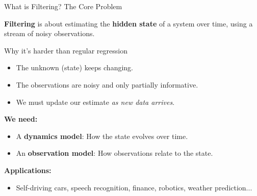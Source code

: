 \documentclass[handout,aspectratio=169]{beamer}
\begin{document}
\begin{frame}{What is Filtering? The Core Problem}

\textbf{Filtering} is about estimating the \textbf{hidden state} of a system over time, using a stream of noisy observations.

\vspace{0.8em}
\begin{block}{Why it’s harder than regular regression}
\begin{itemize}
  \item The unknown (state) keeps changing.
  \item The observations are noisy and only partially informative.
  \item We must update our estimate \textit{as new data arrives}.
\end{itemize}
\end{block}

\vspace{0.8em}
\textbf{We need:}
\begin{itemize}
  \item A \textbf{dynamics model}: How the state evolves over time.
  \item An \textbf{observation model}: How observations relate to the state.
\end{itemize}

\vspace{0.8em}
\textbf{Applications:}
\begin{itemize}
  \item Self-driving cars, speech recognition, finance, robotics, weather prediction...
\end{itemize}

\end{frame}
\end{document}

